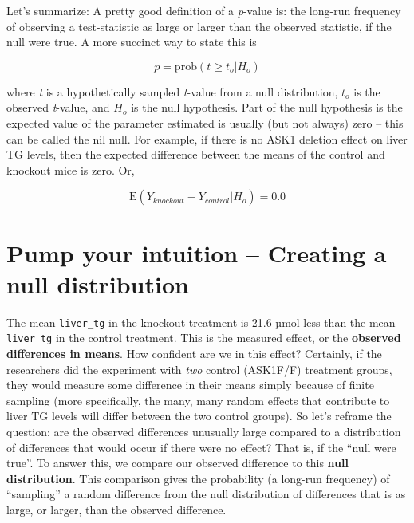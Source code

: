 \documentclass[]{book}
\begin{document}
Let's summarize: A pretty good definition of a \emph{p}-value is: the long-run frequency of observing a test-statistic as large or larger than the observed statistic, if the null were true. A more succinct way to state this is

\begin{equation}
p = \mathrm{prob}(t \ge t_o | H_o)
\end{equation}

where \emph{t} is a hypothetically sampled \emph{t}-value from a null distribution, \(t_o\) is the observed \emph{t}-value, and \(H_o\) is the null hypothesis. Part of the null hypothesis is the expected value of the parameter estimated is usually (but not always) zero -- this can be called the nil null. For example, if there is no ASK1 deletion effect on liver TG levels, then the expected difference between the means of the control and knockout mice is zero. Or,

\begin{equation}
\mathrm{E}(\bar{Y}_{knockout} - \bar{Y}_{control} | H_o) = 0.0
\end{equation}

\hypertarget{pump-your-intuition-creating-a-null-distribution}{%
\section{Pump your intuition -- Creating a null distribution}\label{pump-your-intuition-creating-a-null-distribution}}

The mean \texttt{liver\_tg} in the knockout treatment is 21.6 µmol less than the mean \texttt{liver\_tg} in the control treatment. This is the measured effect, or the \textbf{observed differences in means}. How confident are we in this effect? Certainly, if the researchers did the experiment with \emph{two} control (ASK1F/F) treatment groups, they would measure some difference in their means simply because of finite sampling (more specifically, the many, many random effects that contribute to liver TG levels will differ between the two control groups). So let's reframe the question: are the observed differences unusually large compared to a distribution of differences that would occur if there were no effect? That is, if the ``null were true''. To answer this, we compare our observed difference to this \textbf{null distribution}. This comparison gives the probability (a long-run frequency) of ``sampling'' a random difference from the null distribution of differences that is as large, or larger, than the observed difference.
\end{document}
